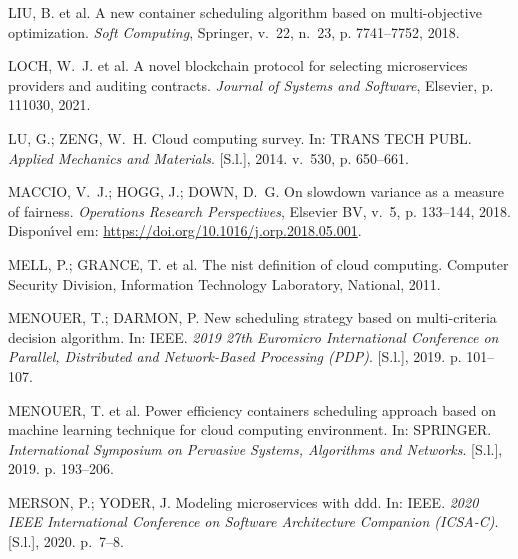 \documentclass[
	12pt,				%
	openright,			%
	oneside,			%
	a4paper,			%
	brazil				%
	]{abntex2}
\begin{document}
\begin{thebibliography}{}
{LIU, B. et al. A new container scheduling algorithm based on multi-objective
  optimization.
\emph{Soft Computing}, Springer, v.~22, n.~23, p. 7741--7752, 2018.}

{LOCH, W.~J. et al. A novel blockchain protocol for selecting microservices
  providers and auditing contracts.
\emph{Journal of Systems and Software}, Elsevier, p. 111030, 2021.}

{LU, G.; ZENG, W.~H. Cloud computing survey. In:  TRANS TECH PUBL.
  \emph{Applied Mechanics and Materials}. [S.l.], 2014. v.~530, p. 650--661.}

{MACCIO, V.~J.; HOGG, J.; DOWN, D.~G. On slowdown variance as a measure of
  fairness.
\emph{Operations Research Perspectives}, Elsevier {BV}, v.~5, p. 133--144,
  2018.
Dispon{\'\i}vel em: \url{https://doi.org/10.1016/j.orp.2018.05.001}.}

{MELL, P.; GRANCE, T. et al. The nist definition of cloud computing.
Computer Security Division, Information Technology Laboratory, National, 2011.}

{MENOUER, T.; DARMON, P. New scheduling strategy based on multi-criteria
  decision algorithm. In:  IEEE. \emph{2019 27th Euromicro International
  Conference on Parallel, Distributed and Network-Based Processing (PDP)}.
  [S.l.], 2019. p. 101--107.}

{MENOUER, T. et al. Power efficiency containers scheduling approach based on
  machine learning technique for cloud computing environment. In:  SPRINGER.
  \emph{International Symposium on Pervasive Systems, Algorithms and Networks}.
  [S.l.], 2019. p. 193--206.}

{MERSON, P.; YODER, J. Modeling microservices with ddd. In:  IEEE. \emph{2020
  IEEE International Conference on Software Architecture Companion (ICSA-C)}.
  [S.l.], 2020. p.~7--8.}


\end{thebibliography}
\end{document}
